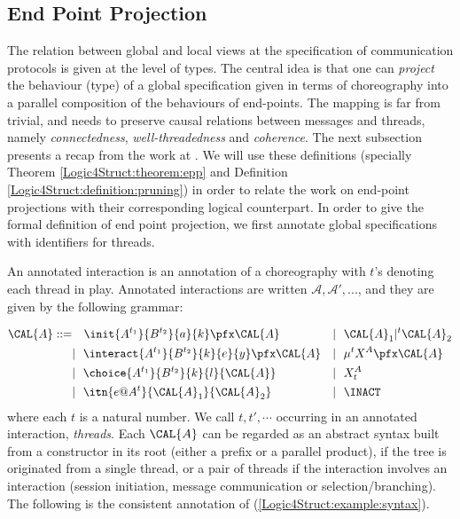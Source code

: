 \subsection{End Point Projection}
\label{Logic4Struct:sec:epp-types}


The relation between global and local views at the specification of
communication protocols is given at the level of types. The central
idea is that one can \emph{project} the behaviour (type) of a
global specification given in terms of choreography into a parallel
composition of the behaviours of end-points. The mapping is far from
trivial, and needs to preserve causal relations between messages and
threads, namely \emph{connectedness}, \emph{well-threadedness} and
\emph{coherence}. The next subsection
presents a recap from the work at \cite{carbone7scc}. We will use
these definitions (specially Theorem \ref{Logic4Struct:theorem:epp}
and Definition \ref{Logic4Struct:definition:pruning}) in order to
relate the work on end-point projections with their corresponding
logical counterpart.
In order to give the formal definition of end point projection, we
first annotate global specifications with identifiers for threads.

  An annotated interaction is an annotation of a choreography with
  $t$'s denoting each thread in play. Annotated interactions are
  written $\mathcal{A,A', ...}$, and they are given by
  the following grammar:

  \begin{align*} 
    \CAL{A} ::= & ~~~\init{A^{t_1}}{ B ^{t_2}}{a}{k} \pfx \CAL{A}
    && |~~\CAL{A}_1 |^t \CAL{A}_2 \\
    & |~~\interact{A^{t_1}}{ B ^{t_2}}{k}{e}{y} \pfx \CAL{A}
    && |~~\mu^t X^A \pfx \CAL{A}\\
    & |~~\choice{A^{t_1}}{B ^{t_2}}{k}{l}{\CAL{A}}
    && |~~ X^A_t \\
    & |~~\itn{e@A^{t}}{\CAL{A}_1}{\CAL{A}_2}
    && |~~\INACT
\end{align*}
where each $t$ is a natural number. We call $t,t',\cdots$ occurring in
an annotated interaction, \emph{threads}. Each $\CAL{A}$ can be
regarded as an abstract syntax built from a constructor in its root
(either a prefix or a parallel product), if the tree is originated
from a single thread, or a pair of threads if the interaction involves
an interaction (session initiation, message communication or
selection/branching). The following is the consistent annotation of
(\ref{Logic4Struct:example:syntax}).


